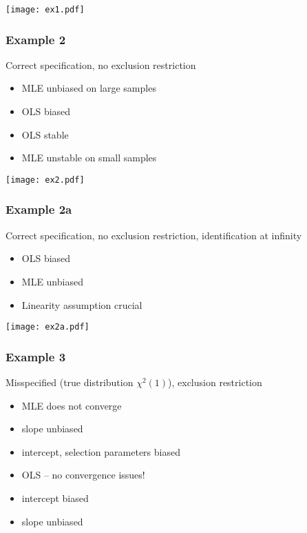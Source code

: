 \documentclass{beamer}
\begin{document}
\begin{frame}
  \texttt{[image: ex1.pdf]}
\end{frame}

\begin{frame}
  \frametitle{Example 2}
  
  Correct specification, no exclusion restriction
  \begin{itemize}
  \item MLE unbiased on large samples
  \item OLS biased
  \item OLS stable
  \item MLE unstable on small samples
  \end{itemize}
\end{frame}

\begin{frame}
  \texttt{[image: ex2.pdf]}
\end{frame}

\begin{frame}
  \frametitle{Example 2a}
  
  Correct specification, no exclusion restriction, identification at
  infinity
  \begin{itemize}
  \item OLS biased
  \item MLE unbiased
  \item Linearity assumption crucial
  \end{itemize}
\end{frame}

\begin{frame}
  \texttt{[image: ex2a.pdf]}
\end{frame}

\begin{frame}
  \frametitle{Example 3}
  
  Misspecified (true distribution $\chi^2(1)$), exclusion restriction
  \begin{itemize}
  \item MLE does not converge
  \item slope unbiased
  \item intercept, selection parameters biased
  \item OLS -- no convergence issues!
  \item intercept biased
  \item slope unbiased
  \end{itemize}
\end{frame}
\end{document}
